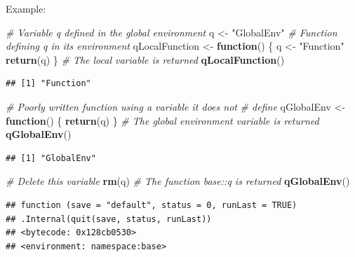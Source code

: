 \documentclass[
  12pt,
  american,
  a4paper,
  extrafontsizes,onecolumn,openright
  ]{memoir}
\newenvironment{Shaded}{\begin{snugshade}}{\end{snugshade}}
\newcommand{\CommentTok}[1]{\textcolor[rgb]{0.56,0.35,0.01}{\textit{#1}}}
\newcommand{\ControlFlowTok}[1]{\textcolor[rgb]{0.13,0.29,0.53}{\textbf{#1}}}
\newcommand{\FunctionTok}[1]{\textcolor[rgb]{0.13,0.29,0.53}{\textbf{#1}}}
\newcommand{\NormalTok}[1]{#1}
\newcommand{\OtherTok}[1]{\textcolor[rgb]{0.56,0.35,0.01}{#1}}
\newcommand{\StringTok}[1]{\textcolor[rgb]{0.31,0.60,0.02}{#1}}
\begin{document}
Example:

\scriptsize

\begin{Shaded}
\begin{Highlighting}[]
\CommentTok{\# Variable q defined in the global environment}
\NormalTok{q }\OtherTok{\textless{}{-}} \StringTok{"GlobalEnv"}
\CommentTok{\# Function defining q in its environment}
\NormalTok{qLocalFunction }\OtherTok{\textless{}{-}} \ControlFlowTok{function}\NormalTok{() \{}
\NormalTok{    q }\OtherTok{\textless{}{-}} \StringTok{"Function"}
    \FunctionTok{return}\NormalTok{(q)}
\NormalTok{\}}
\CommentTok{\# The local variable is returned}
\FunctionTok{qLocalFunction}\NormalTok{()}
\end{Highlighting}
\end{Shaded}

\begin{verbatim}
## [1] "Function"
\end{verbatim}

\begin{Shaded}
\begin{Highlighting}[]
\CommentTok{\# Poorly written function using a variable it does not}
\CommentTok{\# define}
\NormalTok{qGlobalEnv }\OtherTok{\textless{}{-}} \ControlFlowTok{function}\NormalTok{() \{}
    \FunctionTok{return}\NormalTok{(q)}
\NormalTok{\}}
\CommentTok{\# The global environment variable is returned}
\FunctionTok{qGlobalEnv}\NormalTok{()}
\end{Highlighting}
\end{Shaded}

\begin{verbatim}
## [1] "GlobalEnv"
\end{verbatim}

\begin{Shaded}
\begin{Highlighting}[]
\CommentTok{\# Delete this variable}
\FunctionTok{rm}\NormalTok{(q)}
\CommentTok{\# The function base::q is returned}
\FunctionTok{qGlobalEnv}\NormalTok{()}
\end{Highlighting}
\end{Shaded}

\begin{verbatim}
## function (save = "default", status = 0, runLast = TRUE) 
## .Internal(quit(save, status, runLast))
## <bytecode: 0x128cb0530>
## <environment: namespace:base>
\end{verbatim}

\normalsize
\end{document}
